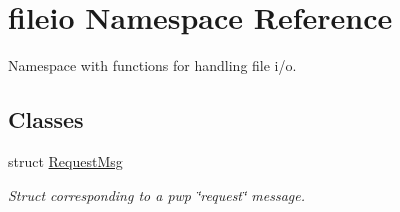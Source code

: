 \hypertarget{namespacefileio}{}\section{fileio Namespace Reference}
\label{namespacefileio}


Namespace with functions for handling file i/o.  


\subsection*{Classes}
\begin{DoxyCompactItemize}
\item 
struct \hyperlink{structfileio_1_1RequestMsg}{Request\+Msg}
\begin{DoxyCompactList}\small\item\em Struct corresponding to a pwp \char`\"{}request\char`\"{} message. \end{DoxyCompactList}\end{DoxyCompactItemize}
